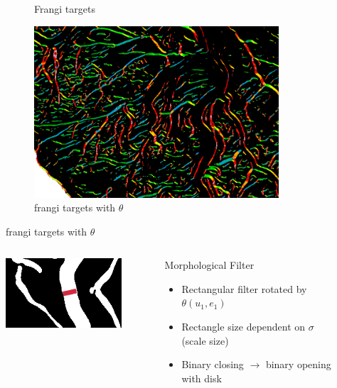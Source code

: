 \documentclass[9pt]{beamer}
\begin{document}
\begin{frame}
\begin{figure}
\begin{subfigure}[b]{0.30\textwidth}
			\caption{Frangi targets}
		\end{subfigure}
		\begin{subfigure}[b]{0.30\textwidth}
			\includegraphics[width=\textwidth]{02pd-inset}
			\caption{frangi targets with $\theta$}
		\end{subfigure}
	\end{figure}
	\begin{columns}[c]
		\begin{column}{0.5\textwidth}
			\begin{figure}
				\includegraphics[height=0.4\textheight]{morphfilter}
			\end{figure}
		\end{column}
		\begin{column}{0.5\textwidth}
			
			\begin{block}{Morphological Filter}
				\begin{itemize}
					\item Rectangular filter rotated by $\theta(u_1,e_1)$
					\item Rectangle size dependent on $\sigma$ (scale size)
					\item Binary closing $\rightarrow$ binary opening with disk
				\end{itemize}
			\end{block}
		\end{column}
	\end{columns}
\end{frame}
\end{document}
